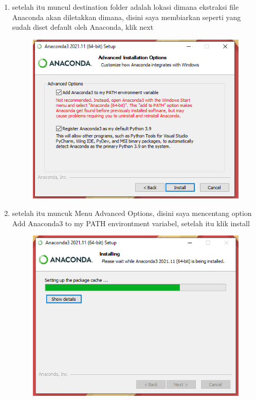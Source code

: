 \begin{enumerate}
\begin{figure}[H]
        \label{instalanacondawindowsstep4}
\end{figure}
\item setelah itu muncul destination folder adalah lokasi dimana ekstraksi file Anaconda akan diletakkan dimana, disini saya membiarkan seperti yang sudah diset default oleh Anaconda, klik next
\begin{figure}[H]
        \centerline{\includegraphics[scale=0.75]{figures/instalasi-anaconda-windows/step5}}
        \label{instalanacondawindowsstep5}
\end{figure}
\item setelah itu muncuk Menu Advanced Options, disini saya mencentang option Add Anaconda3 to my PATH environtment variabel, setelah itu klik install
\begin{figure}[H]
        \centerline{\includegraphics[scale=0.75]{figures/instalasi-anaconda-windows/step6}}

\end{figure}
\end{enumerate}
